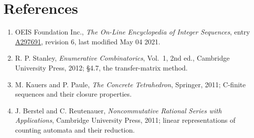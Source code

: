 \documentclass[11pt]{article}
\theoremstyle{definition}
\begin{document}
\section{References}

\begin{enumerate}

\item OEIS Foundation Inc., \emph{The On-Line Encyclopedia of Integer Sequences}, entry \href{https://oeis.org/A297691}{A297691}, revision 6, last modified May 04 2021.

\item R. P. Stanley, \emph{Enumerative Combinatorics}, Vol.~1, 2nd ed., Cambridge University Press, 2012; \S4.7, the transfer-matrix method.

\item M. Kauers and P. Paule, \emph{The Concrete Tetrahedron}, Springer, 2011; C-finite sequences and their closure properties.

\item J. Berstel and C. Reutenauer, \emph{Noncommutative Rational Series with Applications}, Cambridge University Press, 2011; linear representations of counting automata and their reduction.

\end{enumerate}
\end{document}
